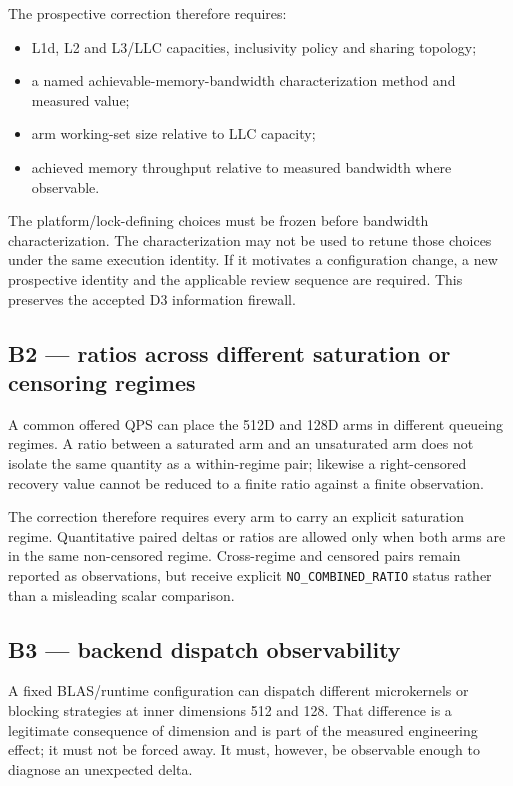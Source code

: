 \documentclass[10pt,a4paper]{article}
\newcommand{\code}[1]{\texttt{#1}}
\begin{document}
The prospective correction therefore requires:
\begin{itemize}
\item L1d, L2 and L3/LLC capacities, inclusivity policy and sharing topology;
\item a named achievable-memory-bandwidth characterization method and measured value;
\item arm working-set size relative to LLC capacity;
\item achieved memory throughput relative to measured bandwidth where observable.
\end{itemize}

The platform/lock-defining choices must be frozen before bandwidth characterization. The characterization may not be used
to retune those choices under the same execution identity. If it motivates a configuration change, a new prospective
identity and the applicable review sequence are required. This preserves the accepted D3 information firewall.

\subsection*{B2 --- ratios across different saturation or censoring regimes}

A common offered QPS can place the 512D and 128D arms in different queueing regimes. A ratio between a saturated arm and an
unsaturated arm does not isolate the same quantity as a within-regime pair; likewise a right-censored recovery value cannot
be reduced to a finite ratio against a finite observation.

The correction therefore requires every arm to carry an explicit saturation regime. Quantitative paired deltas or ratios
are allowed only when both arms are in the same non-censored regime. Cross-regime and censored pairs remain reported as
observations, but receive explicit \code{NO\_COMBINED\_RATIO} status rather than a misleading scalar comparison.

\subsection*{B3 --- backend dispatch observability}

A fixed BLAS/runtime configuration can dispatch different microkernels or blocking strategies at inner dimensions 512 and
128. That difference is a legitimate consequence of dimension and is part of the measured engineering effect; it must not
be forced away. It must, however, be observable enough to diagnose an unexpected delta.
\end{document}
